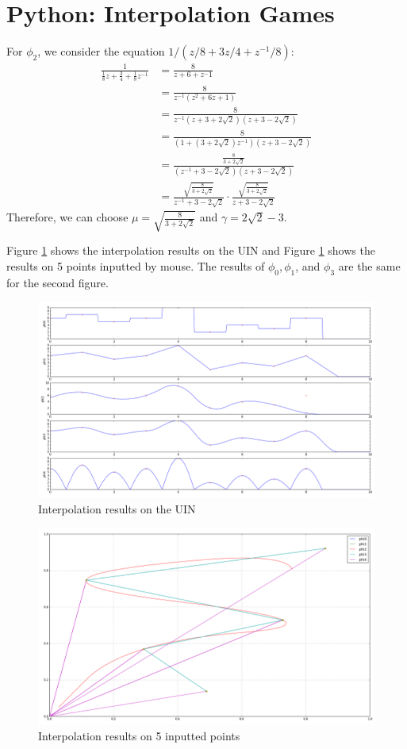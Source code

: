 \section{Python: Interpolation Games}\label{sec:p6}

For $\phi_2$, we consider the equation $1/(z/8 + 3z/4 +z^{-1}/8)$:
\begin{align*}
	\frac{1}{\frac{1}{8}z + \frac{3}{4} + \frac{1}{8}z^{-1}}
	&= \frac{8}{z + 6 + z^-1} \\
	&= \frac{8}{z^{-1}(z^2 + 6z + 1)} \\
	&= \frac{8}{z^{-1}(z+3+2\sqrt{2})(z+3-2\sqrt{2})} \\
	&= \frac{8}{(1+(3+2\sqrt{2})z^{-1})(z+3-2\sqrt{2})} \\
	&= \frac{\frac{8}{3+2\sqrt{2}}}{(z^{-1}+3-2\sqrt{2})(z+3-2\sqrt{2})} \\
	&= \frac{\sqrt{\frac{8}{3+2\sqrt{2}}}}{z^{-1}+3-2\sqrt{2}} \cdot \frac{\sqrt{\frac{8}{3+2\sqrt{2}}}}{z+3-2\sqrt{2}}
\end{align*}
Therefore, we can choose $\mu = \sqrt{\frac{8}{3+2\sqrt{2}}}$ and $\gamma = 2\sqrt{2}-3$.

Figure \ref{fig:p6b} shows the interpolation results on the UIN and Figure \ref{fig:p6b} shows the results on 5 points inputted by mouse. The results of $\phi_0, \phi_1$, and $\phi_3$ are the same for the second figure.
\begin{figure}[htbp]
	\centering
	\includegraphics[width=\linewidth]{images/p6b}
	\caption{Interpolation results on the UIN}
	\label{fig:p6b}
\end{figure}

\begin{figure}[htbp]
	\centering
	\includegraphics[width=\linewidth]{images/p6c}
	\caption{Interpolation results on 5 inputted points}
	\label{fig:p6c}
\end{figure}